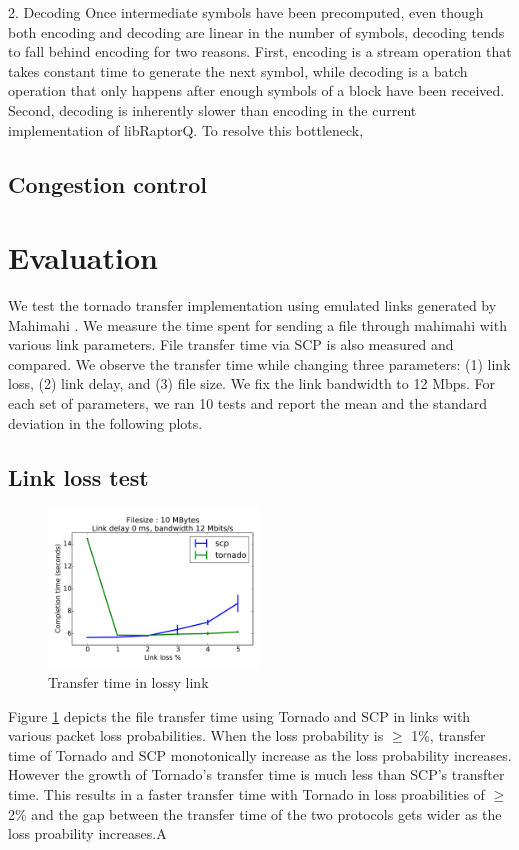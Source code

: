 \documentclass{sig-alternate-10pt}
\begin{document}
2. Decoding
Once intermediate symbols have been precomputed, even though both encoding and decoding are linear in the number of symbols, decoding tends to fall behind encoding for two reasons. First, encoding is a stream operation that takes constant time to generate the next symbol, while decoding is a batch operation that only happens after enough symbols of a block have been received. Second, decoding is inherently slower than encoding in the current implementation of libRaptorQ. To resolve this bottleneck, 
\subsection{Congestion control}

\section{Evaluation}
We test the tornado transfer implementation using emulated links generated by
Mahimahi \cite{mahimahi}. We measure the time spent for sending a file through
mahimahi with various link parameters. File transfer time via SCP is also
measured and compared. We observe the transfer time while changing three
parameters: (1) link loss, (2) link delay, and (3) file size. We fix the link
bandwidth to 12 Mbps. For each set of parameters, we ran 10 tests and report the
mean and the standard deviation in the following plots.

\subsection{Link loss test}

\begin{figure}[t]
  \centering
  \includegraphics[width=0.5\textwidth]{loss-plot}
  \caption{Transfer time in lossy link}
  \label{f:loss-plot}
\end{figure}

Figure \ref{f:loss-plot} depicts the file transfer time using Tornado and SCP in
links with various packet loss probabilities. When the loss probability is
$\geq$ 1\%, transfer time of Tornado and SCP monotonically increase as the loss
probability increases. However the growth of Tornado's transfer time is much
less than SCP's transfter time. This results in a faster transfer time with
Tornado in loss proabilities of $\geq$ 2\% and the gap between the transfer time
of the two protocols gets wider as the loss proability increases.A
\end{document}
